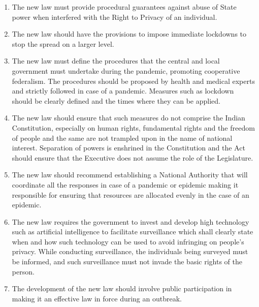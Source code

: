 \begin{multicols}{2}
\begin{enumerate}[label=$\bullet$]
\item The new law must provide procedural guarantees against abuse of State power when
interfered with the Right to Privacy of an individual.


\item The new law should have the provisions to impose immediate lockdowns to stop the
spread on a larger level.


\item The new law must define the procedures that the central and local government must
undertake during the pandemic, promoting cooperative federalism. The procedures
should be proposed by health and medical experts and strictly followed in case of a
pandemic. Measures such as lockdown should be clearly defined and the times where
they can be applied.

\vspace{.1cm}

\item The new law should ensure that such measures do not comprise the Indian
Constitution, especially on human rights, fundamental rights and the freedom of
people and the same are not trampled upon in the name of national interest.
Separation of powers is enshrined in the Constitution and the Act should ensure that
the Executive does not assume the role of the Legislature.


\item The new law should recommend establishing a National Authority that will
coordinate all the responses in case of a pandemic or epidemic making it responsible
for ensuring that resources are allocated evenly in the case of an epidemic.


\item The new law requires the government to invest and develop high technology such as
artificial intelligence to facilitate surveillance which shall clearly state when and how
such technology can be used to avoid infringing on people’s privacy. While
conducting surveillance, the individuals being surveyed must be informed, and such
surveillance must not invade the basic rights of the person.

\item The development of the new law should involve public participation in making it an
effective law in force during an outbreak.


\end{enumerate}
\end{multicols}
